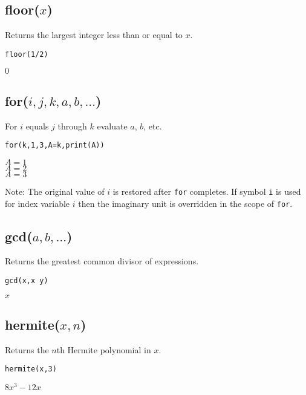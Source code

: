 \subsection*{floor($x$)}

Returns the largest integer less than or equal to $x$.

{\color{blue}
\begin{verbatim}
floor(1/2)
\end{verbatim}
}

\noindent
$0$

\subsection*{for($i,j,k,a,b,\ldots$)}

For $i$ equals $j$ through $k$ evaluate $a$, $b$, etc.

{\color{blue}
\begin{verbatim}
for(k,1,3,A=k,print(A))
\end{verbatim}
}

\noindent
$A=1$\\
$A=2$\\
$A=3$

\bigskip
\noindent
Note: The original value of $i$ is restored after {\tt for} completes.
If symbol {\tt i} is used for index variable $i$
then the imaginary unit is overridden in the scope of {\tt for}.

\subsection*{gcd($a,b,\ldots$)}

Returns the greatest common divisor of expressions.

{\color{blue}
\begin{verbatim}
gcd(x,x y)
\end{verbatim}
}

\noindent
$x$

\subsection*{hermite($x,n$)}

Returns the $n$th Hermite polynomial in $x$.

{\color{blue}
\begin{verbatim}
hermite(x,3)
\end{verbatim}
}

\noindent
$\displaystyle 8x^3-12x$



